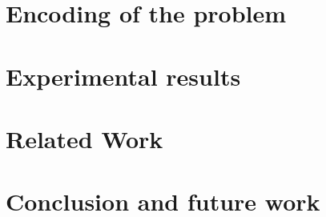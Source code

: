 \documentclass[draft]{llncs}
\begin{document}
\section{Encoding of the problem}
\label{sec:encoding}


\section{Experimental results}
\label{sec:experiments}


\section{Related Work}
\label{sec:related}


\section{Conclusion and future work}
\label{sec:conclusion}





\appendix
\clearpage
\end{document}
